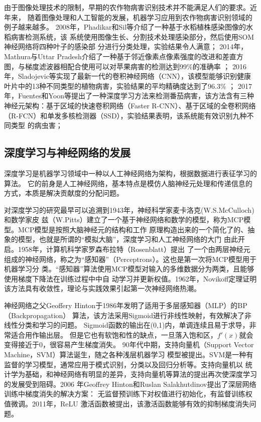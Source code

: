     由于图像处理技术的限制，早期的农作物病害识别技术并不能满足人们的要求。近年来，
    随着图像处理和人工智能的发展，机器学习应用到农作物病害识别领域的例子越来越多。
    2008年，Phadikar和Sil等介绍了一种基于水稻植株感染图像的水稻病害检测系统，该
    系统使用图像生长、分割技术处理感染部分，然后使用SOM神经网络将四种叶子的感染部
    分进行分类处理，实验结果令人满意\cite{phadikar2008rice}；
    2014年，Mathura与Uttar Pradesh介绍了一种基于邻近像素点像素强度的改进和差直方
    图，与梯度滤波器相配合使用可以对苹果病害的检测达到99\%的准确率 \cite{dubey2014fruit}；
    2016年，Sladojevic等实现了最新一代的卷积神经网络（CNN），该模型能够识别健康
    叶片中的13种不同类型的植物病害，实验结果的平均精确度达到了96.3\% \cite{sladojevic2016deep}；
    2017年，Fuentes和Yoon等提出了一种深度学习方法来检测番茄病害，该方法含有三种
    神经元架构：基于区域的快速卷积网络（Faster R-CNN）、基于区域的全卷积网络
    （R-FCN）和单发多核检测器（SSD），实验结果表明，该系统能有效识别九种不同类型
    的病虫害\cite{fuentes2017robust}；

\subsection{\hei\xiaosan\textbf{深度学习与神经网络的发展}}
  深度学习是机器学习领域中一种以人工神经网络为架构，根据数据进行表征学习的算法。
  它的前身是人工神经网络，基本特点是模仿人脑神经元处理和传递信息的方式，本质是解决贡献度的分配问题。

  对深度学习的研究\zs 最早可以追溯到1943年，\zs 神经科学家麦卡洛克(W.S.McCulloch)\zs 和数学家皮
  兹（W.Pitts）建立了一个\zs 基于神经网络和数学\zs 的模型，称为MCP模型。MCP模型\zs 是按照大脑神经元的\zs 结构和工作
  原理构造出来的\zs 一个简化了的、抽象的\zs 模型，也就是所谓的“模拟\zs 大脑”，深度学习和\zs 人工神经网络的大门
  由此开启\cite{mcculloch1990logical}。1958\zs 年，计算机科学\zs 家罗森布拉特（Rosenblatt）\zs 提出
  了一个由\zs 两层神经元组成的\zs 神经网络，称之为“感\zs 知器”（Perceptrons）。这也是第一次将MCP\zs 模型用于机器学习分
  类。“感知器”算法使用MCP\zs 模型对输入的多维\zs 数据分为两类，且能够使用\zs 梯度下降法在训练\zs 过程中中自
  动学习并\zs 更新权值。1962年，Novikoff定理证明该方法具有收敛性，理论与实践效果引起第一次神经网络热潮。

  神经网络之父\zs Geoffery Hinton\zs 于19\zs 86年发明了适用于多层\zs 感知器（MLP）的BP（Backpropagation）
  算法，该方法采用Sig\zs moid进行非线\zs 性映射，有效解决了非线\zs 性分类和学习\zs 的问题。
  Sigmoid函数的输出在(0,1)内，单调连续且易于求导，非常适合用作输出层。
  但是它也有软\zs 饱和性的缺点，一旦落入\zs 饱和区，$f'(x)$就会变得接近于0，很容易产生梯度消失。
  90年代中期，支持\zs 向量机（Support Vec\zs tor Machine，SVM）算法诞生，随之\zs 各种浅层机器学习\zs 
  模型被提出。SVM\zs 是一种有监督\zs 的学习模型，通常应用于模式\zs 识别，分类以及回归\zs 分析等。支持向量\zs 机以
  统计学为基础，和\zs 神经网络有明\zs 显的差异，支持向量机等算法的提出再次使深度学习的发展受到阻碍。2006
  年Geoffrey Hinton和Ruslan Salakhutdinov提出了深层网络训练中梯度消失的解决方案：
  无监督预训练下对权值进行初始化，有监督训练权值微调\cite{hinton2006reducing}。2011年，ReLU
  激活函数被提出，该激活函数能够有效的抑制梯度消失问题。

